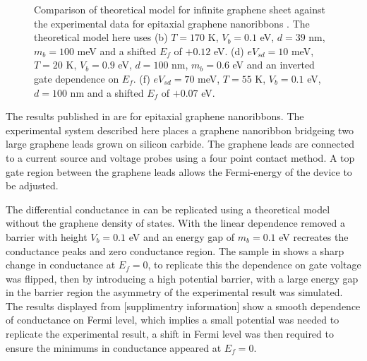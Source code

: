 \documentclass[prl,twocolumn,aps,superscriptaddress,floatfix,10pt]{revtex4}
\begin{document}
\begin{figure}
	\caption{Comparison of theoretical model for infinite graphene sheet against the experimental data for epitaxial graphene nanoribbons \cite{b11}. The theoretical model here uses (b) $T=170$ K, $V_{b}=0.1$ eV, $d=39$ nm, $m_{b}=100$ meV and a shifted $E_{f}$ of $+0.12$ eV. (d) $eV_{sd}=10$ meV, $T=20$ K, $V_{b}=0.9$ eV, $d=100$ nm, $m_{b}=0.6$ eV and an inverted gate dependence on $E_{f}$. (f) $eV_{sd}=70$ meV, $T=55$ K, $V_{b}=0.1$ eV, $d=100$ nm and a shifted $E_{f}$ of $+0.07$ eV.}
	\label{exp-a-flat}
\end{figure}

The results published in \cite{b11} are for epitaxial graphene nanoribbons. The experimental system described here places a graphene nanoribbon bridgeing two large graphene leads grown on silicon carbide. The graphene leads are connected to a current source and voltage probes using a four point contact method. A top gate region between the graphene leads allows the Fermi-energy of the device to be adjusted. 

	The differential conductance in \cite{b11} can be replicated using a theoretical model without the graphene density of states. With the linear dependence removed a barrier with height $V_{b}=0.1$ eV and an energy gap of $m_{b}=0.1$ eV recreates the conductance peaks and zero conductance region. The sample in \cite{b11} shows a sharp change in conductance at $E_{f}=0$, to replicate this the dependence on gate voltage was flipped, then by introducing a high potential barrier, with a large energy gap in the barrier region the asymmetry of the experimental result was simulated. The results displayed from \cite{b11}[supplimentry information] show a smooth dependence of conductance on Fermi level, which implies a small potential was needed to replicate the experimental result, a shift in Fermi level was then required to ensure the minimums in conductance appeared at $E_{f}=0$.
\end{document}
